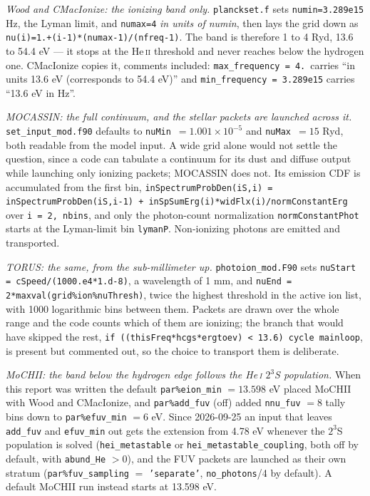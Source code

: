 \documentclass[11pt]{my_memo}
\begin{document}
\emph{Wood and CMacIonize: the ionizing band only.}  \texttt{planckset.f} sets
\texttt{numin=3.289e15} Hz, the Lyman limit, and \texttt{numax=4} \emph{in units
of numin}, then lays the grid down as
\texttt{nu(i)=1.+(i-1)*(numax-1)/(nfreq-1)}.  The band is therefore 1 to 4 Ryd,
13.6 to 54.4 eV --- it stops at the He\,\textsc{ii} threshold and never reaches
below the hydrogen one.  CMacIonize copies it, comments included:
\texttt{max\_frequency = 4.}\ carries ``in units 13.6 eV (corresponds to 54.4
eV)'' and \texttt{min\_frequency = 3.289e15} carries ``13.6 eV in Hz''.

\emph{MOCASSIN: the full continuum, and the stellar packets are launched across
it.}  \texttt{set\_input\_mod.f90} defaults to \texttt{nuMin}~$=1.001\times10^{-5}$
and \texttt{nuMax}~$=15$ Ryd, both readable from the model input.  A wide grid
alone would not settle the question, since a code can tabulate a continuum for
its dust and diffuse output while launching only ionizing packets; MOCASSIN does
not.  Its emission CDF is accumulated from the first bin,
\texttt{inSpectrumProbDen(iS,i) = inSpectrumProbDen(iS,i-1) +
inSpSumErg(i)*widFlx(i)/normConstantErg} over \texttt{i = 2, nbins}, and only the
photon-count normalization \texttt{normConstantPhot} starts at the Lyman-limit bin
\texttt{lymanP}.  Non-ionizing photons are emitted and transported.

\emph{TORUS: the same, from the sub-millimeter up.}
\texttt{photoion\_mod.F90} sets \texttt{nuStart = cSpeed/(1000.e4*1.d-8)}, a
wavelength of 1 mm, and \texttt{nuEnd = 2*maxval(grid\%ion\%nuThresh)}, twice the
highest threshold in the active ion list, with 1000 logarithmic bins between
them.  Packets are drawn over the whole range and the code counts which of them
are ionizing; the branch that would have skipped the rest,
\texttt{if ((thisFreq*hcgs*ergtoev) < 13.6) cycle mainloop}, is present but
commented out, so the choice to transport them is deliberate.

\emph{MoCHII: the band below the hydrogen edge follows the He\,\textsc{i}
$2^3$S population.}  When this report was written the default
\texttt{par\%eion\_min} $=13.598$ eV placed MoCHII with Wood and CMacIonize, and
\texttt{par\%add\_fuv} (off) added \texttt{nnu\_fuv} $=8$ tally bins down to
\texttt{par\%efuv\_min} $=6$ eV.  Since 2026-09-25 an input that leaves
\texttt{add\_fuv} and \texttt{efuv\_min} out gets the extension from 4.78 eV
whenever the $2^3$S population is solved (\texttt{hei\_metastable} or
\texttt{hei\_metastable\_coupling}, both off by default, with
\texttt{abund\_He} $>0$), and the FUV packets are launched as their own stratum
(\texttt{par\%fuv\_sampling} $=$ \texttt{'separate'}, \texttt{no\_photons}/4 by
default). A default MoCHII run instead starts at 13.598 eV.
\end{document}
